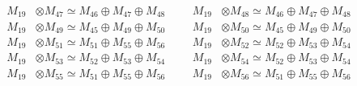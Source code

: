\begin{align*}
M_{19} &\otimes M_{47} \simeq M_{46} \oplus M_{47} \oplus M_{48} &&& M_{19} &\otimes M_{48} \simeq M_{46} \oplus M_{47} \oplus M_{48}\\
M_{19} &\otimes M_{49} \simeq M_{45} \oplus M_{49} \oplus M_{50} &&& M_{19} &\otimes M_{50} \simeq M_{45} \oplus M_{49} \oplus M_{50}\\
M_{19} &\otimes M_{51} \simeq M_{51} \oplus M_{55} \oplus M_{56} &&& M_{19} &\otimes M_{52} \simeq M_{52} \oplus M_{53} \oplus M_{54}\\
M_{19} &\otimes M_{53} \simeq M_{52} \oplus M_{53} \oplus M_{54} &&& M_{19} &\otimes M_{54} \simeq M_{52} \oplus M_{53} \oplus M_{54}\\
M_{19} &\otimes M_{55} \simeq M_{51} \oplus M_{55} \oplus M_{56} &&& M_{19} &\otimes M_{56} \simeq M_{51} \oplus M_{55} \oplus M_{56}\\
\end{align*}

